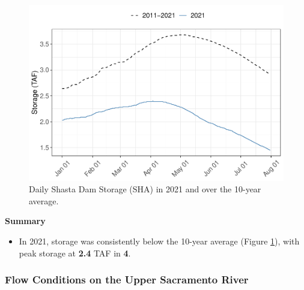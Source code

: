 \documentclass[
]{book}
\providecommand{\tightlist}{%
  \setlength{\itemsep}{0pt}\setlength{\parskip}{0pt}}
\theoremstyle{definition}
\theoremstyle{definition}
\theoremstyle{definition}
\theoremstyle{definition}
\theoremstyle{remark}
\begin{document}
\begin{figure}
\centering
\includegraphics{_main_files/figure-latex/SHAstor-fig-1.pdf}
\caption{\label{fig:SHAstor-fig}Daily Shasta Dam Storage (SHA) in 2021 and over the 10-year average.}
\end{figure}

\textbf{Summary}

\begin{itemize}
\tightlist
\item
  In 2021, storage was consistently below the 10-year average (Figure \ref{fig:SHAstor-fig}), with peak storage at \textbf{2.4} TAF in \textbf{4}.
\end{itemize}

\hypertarget{flow-conditions-on-the-upper-sacramento-river}{%
\subsubsection{Flow Conditions on the Upper Sacramento River}\label{flow-conditions-on-the-upper-sacramento-river}}
\end{document}
